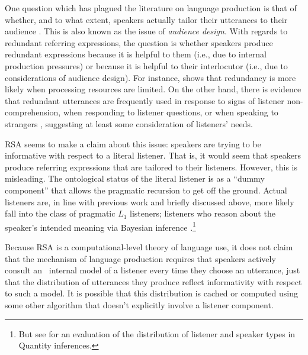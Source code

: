 \documentclass[11pt]{article}
\begin{document}
One question which has plagued the literature on language production is that of whether, and to what extent, speakers actually tailor their utterances to their audience \cite{Clark1982, horton1996, Brown-schmidt2014}. This is also known as the issue of \emph{audience design}. With regards to redundant referring expressions, the question is whether speakers produce redundant expressions because it is helpful to them (i.e., due to internal production pressures) or  because it is helpful to their interlocutor (i.e., due to considerations of audience design). For instance,  shows that redundancy is more likely when processing resources are limited. On the other hand, there is evidence that redundant  utterances are frequently used in response to signs of
listener non-comprehension, when responding to listener questions, or when speaking to
strangers \cite{Baker2008}, suggesting at least some consideration of listeners' needs.

RSA seems to make a claim about this issue: speakers are trying to be informative with respect to a literal listener. That is, it would seem that speakers produce referring expressions that are tailored to their listeners. However, this is misleading. The ontological status of the literal listener is as a ``dummy component'' that allows the pragmatic recursion to get off the ground. Actual listeners are, in line with previous work and briefly discussed above, more likely fall into the class of pragmatic $L_1$ listeners; listeners who reason about the speaker's intended meaning via Bayesian inference \cite{frank2012, goodmanstuhlmueller2013}.\footnote{But see  for an evaluation of the distribution of listener and speaker types in Quantity inferences.}

Because RSA is a computational-level theory \cite{marr1982} of language use, it does not claim that the mechanism of language production requires that speakers actively consult an  internal model of a listener every time they choose an utterance, just that the distribution of utterances they produce reflect informativity with respect to such a model. It is possible that this distribution is cached or computed using some other algorithm that doesn't explicitly involve a listener component. 

\end{document}
